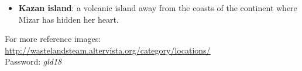 \begin{itemize}
	\item \textbf{Kazan island}: a volcanic island away from the coasts of the continent where Mizar has hidden her heart.
	
\end{itemize}
For more reference images: \href{http://wastelandsteam.altervista.org/category/locations/}{http://wastelandsteam.altervista.org/category/locations/}\\
Password: \textit{gld18}
